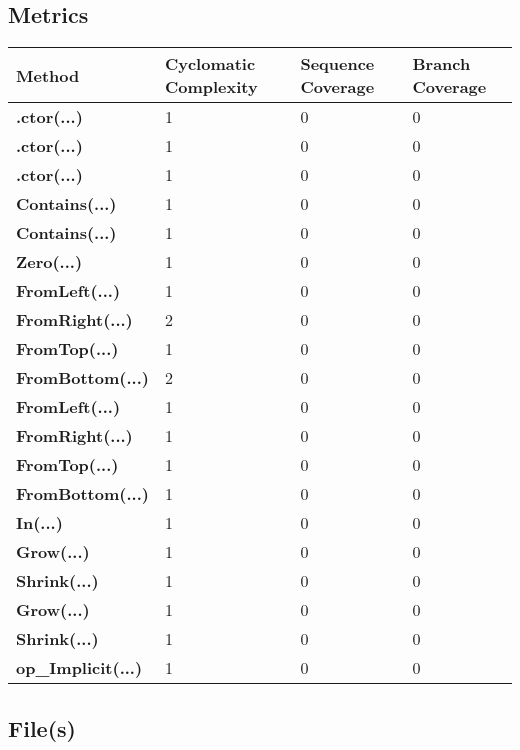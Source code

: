 \documentclass[a4paper,10pt]{article}
\begin{document}
\subsection{Metrics}
\begin{longtable}[l]{|l|l|l|l|}
\hline
\textbf{Method} & \textbf{Cyclomatic Complexity} & \textbf{Sequence Coverage} & \textbf{Branch Coverage}\\
\hline
\textbf{.ctor(...)} & 1 & 0 & 0\\
\hline
\textbf{.ctor(...)} & 1 & 0 & 0\\
\hline
\textbf{.ctor(...)} & 1 & 0 & 0\\
\hline
\textbf{Contains(...)} & 1 & 0 & 0\\
\hline
\textbf{Contains(...)} & 1 & 0 & 0\\
\hline
\textbf{Zero(...)} & 1 & 0 & 0\\
\hline
\textbf{FromLeft(...)} & 1 & 0 & 0\\
\hline
\textbf{FromRight(...)} & 2 & 0 & 0\\
\hline
\textbf{FromTop(...)} & 1 & 0 & 0\\
\hline
\textbf{FromBottom(...)} & 2 & 0 & 0\\
\hline
\textbf{FromLeft(...)} & 1 & 0 & 0\\
\hline
\textbf{FromRight(...)} & 1 & 0 & 0\\
\hline
\textbf{FromTop(...)} & 1 & 0 & 0\\
\hline
\textbf{FromBottom(...)} & 1 & 0 & 0\\
\hline
\textbf{In(...)} & 1 & 0 & 0\\
\hline
\textbf{Grow(...)} & 1 & 0 & 0\\
\hline
\textbf{Shrink(...)} & 1 & 0 & 0\\
\hline
\textbf{Grow(...)} & 1 & 0 & 0\\
\hline
\textbf{Shrink(...)} & 1 & 0 & 0\\
\hline
\textbf{op\_Implicit(...)} & 1 & 0 & 0\\
\hline
\end{longtable}
\subsection{File(s)}
\end{document}
